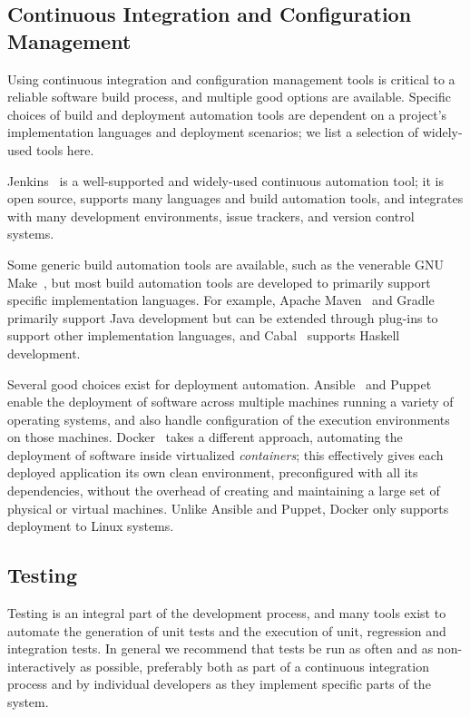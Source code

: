 \subsection{Continuous Integration and Configuration Management}

Using continuous integration and configuration management tools is
critical to a reliable software build process, and multiple good
options are available. Specific choices of build and deployment
automation tools are dependent on a project's implementation languages
and deployment scenarios; we list a selection of widely-used tools
here.

Jenkins~\cite{Jenkins} is a well-supported and
widely-used continuous automation tool; it is open source, supports
many languages and build automation tools, and integrates with many
development environments, issue trackers, and version control
systems. 

Some generic build automation tools are available, such as the
venerable GNU Make~\cite{GNUMake}, but most build automation tools
are developed to primarily support specific implementation
languages. For example, Apache Maven~\cite{ApacheMaven} and
Gradle~\cite{Gradle} primarily support Java development but can be
extended through plug-ins to support other implementation languages,
and Cabal~\cite{Cabal} supports Haskell development.

Several good choices exist for deployment
automation. Ansible~\cite{Ansible} and Puppet~\cite{Puppet} enable the
deployment of software across multiple machines running a variety of
operating systems, and also handle configuration of the execution
environments on those machines. Docker~\cite{Docker} takes a different
approach, automating the deployment of software inside virtualized
\emph{containers}; this effectively gives each deployed application
its own clean environment, preconfigured with all its dependencies,
without the overhead of creating and maintaining a large set of
physical or virtual machines. Unlike Ansible and Puppet, Docker only
supports deployment to Linux systems. 

\subsection{Testing}

Testing is an integral part of the development process, and many tools
exist to automate the generation of unit tests and the execution of
unit, regression and integration tests. In general we recommend that
tests be run as often and as non-interactively as possible, preferably
both as part of a continuous integration process and by individual
developers as they implement specific parts of the system.

